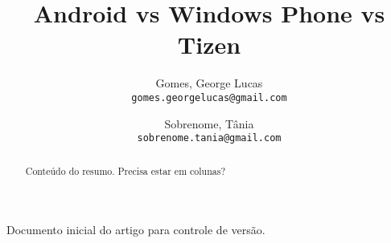 \documentclass[11pt,a4paper]{article}
\author{
	Gomes, George Lucas\\
	\texttt{gomes.georgelucas@gmail.com}
	\and
	Sobrenome, Tânia\\
	\texttt{sobrenome.tania@gmail.com}
}
\title{\Huge Android vs Windows Phone vs Tizen}
\begin{document}
\maketitle
	\begin{abstract}
		Conteúdo do resumo. Precisa estar em colunas?
	\end{abstract}

	\tableofcontents
Documento inicial do artigo para controle de versão.
\end{document}
